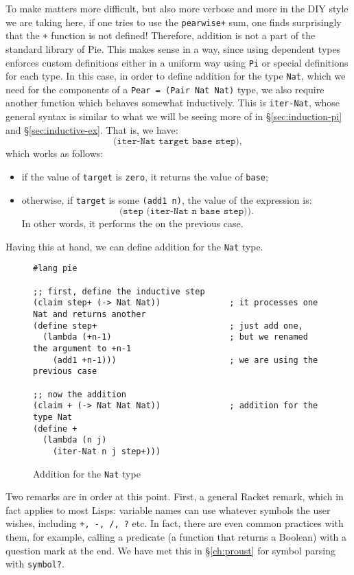 To make matters more difficult, but also more verbose and more in the DIY
style we are taking here, if one tries to use the \texttt{pearwise+} sum,
one finds surprisingly that the \texttt{+} function is not defined! Therefore,
addition is not a part of the standard library of Pie. This makes sense in a way,
since using dependent types enforces custom definitions either in a uniform
way using \texttt{Pi} or special definitions for each type. In this case,
in order to define addition for the type \texttt{Nat}, which we need for the
components of a \texttt{Pear = (Pair Nat Nat)} type, we also require another
function which behaves somewhat inductively. This is \texttt{iter-Nat},
whose general syntax is similar to what we will be seeing more of in
\S\ref{sec:induction-pi} and \S\ref{sec:inductive-ex}. That is, we have:
\[
  \texttt{(iter-Nat target base step)},
\]
which works as follows:
\begin{itemize}
\item if the value of \texttt{target} is \texttt{zero}, it returns
  the value of \texttt{base};
\item otherwise, if \texttt{target} is some \texttt{(add1 n)},
  the value of the expression is:
  \[
    \texttt{(step (iter-Nat n base step))}.
  \]
  In other words, it performs the 
  on the previous case.
\end{itemize}

Having this at hand, we can define addition for the \texttt{Nat} type.
\begin{figure}[!htbp]
  
  {
    \small
\begin{verbatim}
#lang pie

;; first, define the inductive step
(claim step+ (-> Nat Nat))              ; it processes one Nat and returns another
(define step+                           ; just add one,
  (lambda (+n-1)                        ; but we renamed the argument to +n-1
    (add1 +n-1)))                       ; we are using the previous case

;; now the addition
(claim + (-> Nat Nat Nat))              ; addition for the type Nat
(define +                               
  (lambda (n j)
    (iter-Nat n j step+)))
\end{verbatim}
  }
  \caption{Addition for the \texttt{Nat} type}
  \label{fig:plus-nat}
\end{figure}

Two remarks are in order at this point. First, a general Racket remark,
which in fact applies to most Lisps: variable names can use whatever
symbols the user wishes, including \texttt{+, -, /, ?} etc. In fact,
there are even common practices with them, for example, calling a predicate
(a function that returns a Boolean) with a question mark at the end. We have
met this in \S\ref{ch:proust} for symbol parsing with \texttt{symbol?}.

